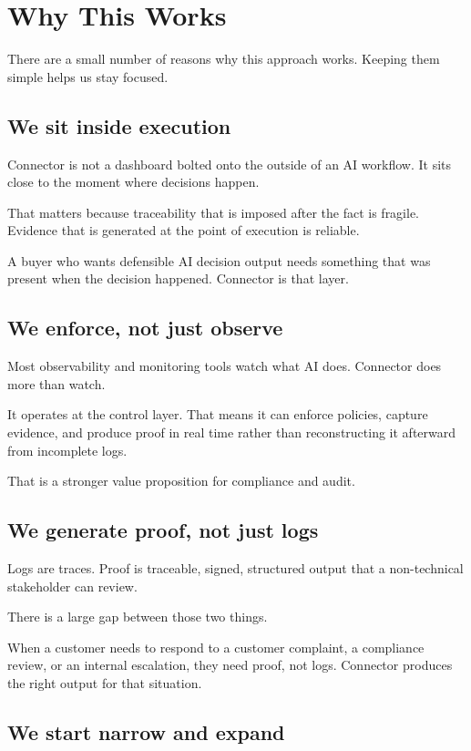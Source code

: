 \chapter{Why This Works}

There are a small number of reasons why this approach works.
Keeping them simple helps us stay focused.

\section{We sit inside execution}

Connector is not a dashboard bolted onto the outside of an AI workflow.
It sits close to the moment where decisions happen.

That matters because traceability that is imposed after the fact is fragile.
Evidence that is generated at the point of execution is reliable.

A buyer who wants defensible AI decision output needs something that was present when the decision happened.
Connector is that layer.

\section{We enforce, not just observe}

Most observability and monitoring tools watch what AI does.
Connector does more than watch.

It operates at the control layer.
That means it can enforce policies, capture evidence, and produce proof in real time rather than reconstructing it afterward from incomplete logs.

That is a stronger value proposition for compliance and audit.

\section{We generate proof, not just logs}

Logs are traces.
Proof is traceable, signed, structured output that a non-technical stakeholder can review.

There is a large gap between those two things.

When a customer needs to respond to a customer complaint, a compliance review, or an internal escalation, they need proof, not logs.
Connector produces the right output for that situation.

\section{We start narrow and expand}

